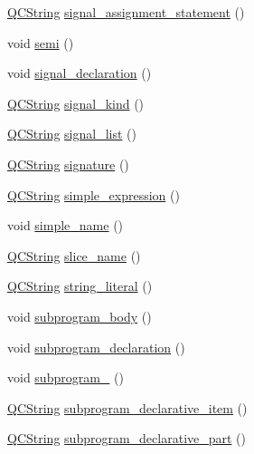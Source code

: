 \begin{DoxyCompactItemize}
\item 
\hyperlink{class_q_c_string}{Q\+C\+String} \hyperlink{classvhdl_1_1parser_1_1_vhdl_parser_a7eb1a1cd7d968bb777d2f0352e0cc063}{signal\+\_\+assignment\+\_\+statement} ()
\item 
void \hyperlink{classvhdl_1_1parser_1_1_vhdl_parser_a03d812f3cc60cc465bf62422da2086bc}{semi} ()
\item 
void \hyperlink{classvhdl_1_1parser_1_1_vhdl_parser_a71ad7b4c9f58f8279a11b0dd3be61302}{signal\+\_\+declaration} ()
\item 
\hyperlink{class_q_c_string}{Q\+C\+String} \hyperlink{classvhdl_1_1parser_1_1_vhdl_parser_a3e7052ff860b1949fb287c3a5385ce56}{signal\+\_\+kind} ()
\item 
\hyperlink{class_q_c_string}{Q\+C\+String} \hyperlink{classvhdl_1_1parser_1_1_vhdl_parser_a544e23647ba0876011208c260236ab0d}{signal\+\_\+list} ()
\item 
\hyperlink{class_q_c_string}{Q\+C\+String} \hyperlink{classvhdl_1_1parser_1_1_vhdl_parser_a8e2d85ce9f44c14f7ec999dce3837cc9}{signature} ()
\item 
\hyperlink{class_q_c_string}{Q\+C\+String} \hyperlink{classvhdl_1_1parser_1_1_vhdl_parser_a7c2f79972e56de633cda506cc7404fda}{simple\+\_\+expression} ()
\item 
void \hyperlink{classvhdl_1_1parser_1_1_vhdl_parser_a1da6d775939eb0f4924fed442a77621f}{simple\+\_\+name} ()
\item 
\hyperlink{class_q_c_string}{Q\+C\+String} \hyperlink{classvhdl_1_1parser_1_1_vhdl_parser_ab9a0720910f8d84cfe8ed62f7dc11850}{slice\+\_\+name} ()
\item 
\hyperlink{class_q_c_string}{Q\+C\+String} \hyperlink{classvhdl_1_1parser_1_1_vhdl_parser_a39b4e26d7d1a20cea536179edf7296a6}{string\+\_\+literal} ()
\item 
void \hyperlink{classvhdl_1_1parser_1_1_vhdl_parser_aae9edcb0b16f8e7dc4d1bf2575d98036}{subprogram\+\_\+body} ()
\item 
void \hyperlink{classvhdl_1_1parser_1_1_vhdl_parser_a69408f8b2b5f452cd4e2226eb74e2316}{subprogram\+\_\+declaration} ()
\item 
void \hyperlink{classvhdl_1_1parser_1_1_vhdl_parser_aabc13f0f5d04abbef514f229a03d25be}{subprogram\+\_} ()
\item 
\hyperlink{class_q_c_string}{Q\+C\+String} \hyperlink{classvhdl_1_1parser_1_1_vhdl_parser_ace95c1f2fa4f58587ed90dc43ec3cde8}{subprogram\+\_\+declarative\+\_\+item} ()
\item 
\hyperlink{class_q_c_string}{Q\+C\+String} \hyperlink{classvhdl_1_1parser_1_1_vhdl_parser_a273b0f7b5d97b8c7afad80d517bd4dff}{subprogram\+\_\+declarative\+\_\+part} ()

\end{DoxyCompactItemize}
